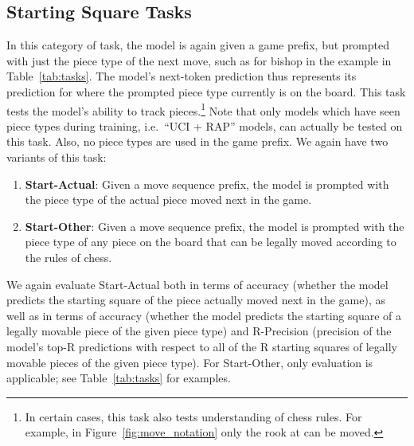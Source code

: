 \subsection{Starting Square Tasks}
In this category of task, the model is again given a game prefix, but prompted with just the piece type of the next move, such as  for bishop in the example in Table~\ref{tab:tasks}. The model's next-token prediction thus represents its prediction for where the prompted piece type currently is on the board. This task tests the model's ability to track pieces.\footnote{In certain cases, this task also tests understanding of chess rules. For example, in Figure~\ref{fig:move_notation} only the rook at  can be moved.}
Note that only models which have seen piece types during training, i.e.\ ``UCI + RAP'' models, can actually be tested on this task.
Also, no piece types are used in the game prefix. %
We again have two variants of this task:
\begin{enumerate}
	\item \textbf{Start-Actual}: Given a move sequence prefix, the model is prompted with the piece type of the actual piece moved next in the game. 
	\item \textbf{Start-Other}: Given a move sequence prefix, the model is prompted with the piece type of any piece on the board that can be legally moved according to the rules of chess. %
\end{enumerate}
We again evaluate Start-Actual %
both in terms of \exactmove accuracy (whether the model predicts the starting square of the piece actually moved next in the game), as well as in terms of \legalmove accuracy (whether the model predicts the starting square of a legally movable piece of the given piece type) and \legalmove R-Precision (precision of the model's top-R predictions with respect to all of the R starting squares of legally movable pieces of the given piece type). For Start-Other, only \legalmove evaluation is applicable; see Table~\ref{tab:tasks} for examples.

